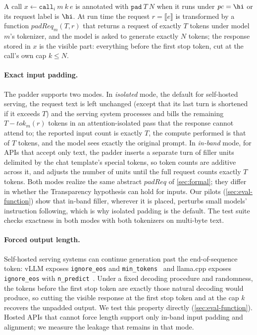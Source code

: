 A call $x \leftarrow \texttt{call}_i\ m\ k\ e$ is annotated with $\texttt{pad}\ T\ N$ when it runs under $\mathit{pc}=\hi$ or its request label is $\hi$. At run time the request $r = \llbracket e \rrbracket$ is transformed by a function $\mathit{padReq}_m(T, r)$ that returns a request of exactly $T$ tokens under model $m$'s tokenizer, and the model is asked to generate exactly $N$ tokens; the response stored in $x$ is the visible part: everything before the first stop token, cut at the call's own cap $k \le N$.

\paragraph{Exact input padding.} The padder supports two modes. In \emph{isolated} mode, the default for self-hosted serving, the request text is left unchanged (except that its last turn is shortened if it exceeds $T$) and the serving system processes and bills the remaining $T - \mathit{tok}_m(r)$ tokens in an attention-isolated pass that the response cannot attend to; the reported input count is exactly $T$, the compute performed is that of $T$ tokens, and the model sees exactly the original prompt. In \emph{in-band} mode, for APIs that accept only text, the padder inserts a separate turn of filler units delimited by the chat template's special tokens, so token counts are additive across it, and adjusts the number of units until the full request counts exactly $T$ tokens. Both modes realize the same abstract $\mathit{padReq}$ of \cref{sec:formal}; they differ in whether the Transparency hypothesis can hold for inputs. Our pilots (\cref{sec:eval-function}) show that in-band filler, wherever it is placed, perturbs small models' instruction following, which is why isolated padding is the default. The test suite checks exactness in both modes with both tokenizers on multi-byte text.

\paragraph{Forced output length.} Self-hosted serving systems can continue generation past the end-of-sequence token: vLLM exposes \texttt{ignore\_eos} and \texttt{min\_tokens}~\cite{vllm2026sampling} and llama.cpp exposes \texttt{ignore\_eos} with \texttt{n\_predict}~\cite{llamacpp2026server}. Under a fixed decoding procedure and randomness, the tokens before the first stop token are exactly those natural decoding would produce, so cutting the visible response at the first stop token and at the cap $k$ recovers the unpadded output. We test this property directly (\cref{sec:eval-function}). Hosted APIs that cannot force length support only in-band input padding and alignment; we measure the leakage that remains in that mode.

